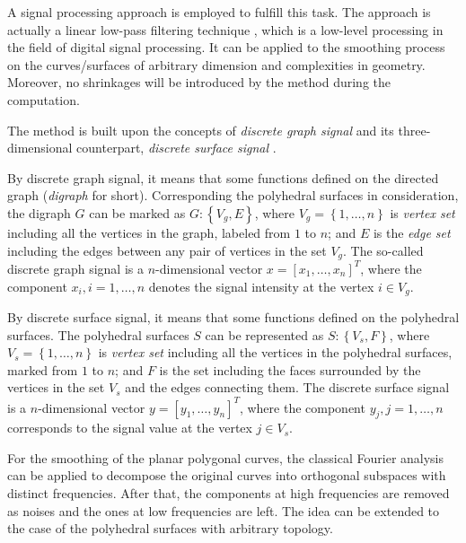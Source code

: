 A signal processing approach is employed to fulfill this task.
The approach is actually a linear low-pass filtering technique \cite{Taubin1995ICCV}, which is a low-level processing in the field of digital signal processing.
It can be applied to the smoothing process on the curves/surfaces of arbitrary dimension and complexities in geometry.
Moreover, no shrinkages will be introduced by the method during the computation.

The method is built upon the concepts of \emph{discrete graph signal} and its three-dimensional counterpart, \emph{discrete surface signal} \cite{Taubin1995SIG}.

By discrete graph signal, it means that some functions defined on the directed graph (\emph{digraph} for short).
Corresponding the polyhedral surfaces in consideration, the digraph $G$ can be marked as $G: \left\{ V_g, E\right\}$, where $V_g = \left\{ 1, \ldots, n \right\}$ is \emph{vertex set} including all the vertices in the graph, labeled from $1$ to $n$; and $E$ is the \emph{edge set} including the edges between any pair of vertices in the set $V_g$. %
The so-called discrete graph signal is a $n$-dimensional vector $x = \left[ x_1, \ldots, x_n \right]^T$, where the component $x_i, i = 1, \ldots, n$ denotes the signal intensity at the vertex $i \in V_g$. %

By discrete surface signal, it means that some functions defined on the polyhedral surfaces.
The polyhedral surfaces $S$ can be represented as $S: \left\{ V_s, F\right\}$, where $V_s = \left\{ 1, \ldots, n \right\}$ is \emph{vertex set} including all the vertices in the polyhedral surfaces, marked from $1$ to $n$; and $F$ is the set including the faces surrounded by the vertices in the set $V_s$ and the edges connecting them. %
The discrete surface signal is a $n$-dimensional vector $y = \left[ y_1, \ldots, y_n \right]^T$, where the component $y_j, j = 1, \ldots, n$ corresponds to the signal value at the vertex $j \in V_s$. %

For the smoothing of the planar polygonal curves, the classical Fourier analysis can be applied to decompose the original curves into orthogonal subspaces with distinct frequencies. %
After that, the components at high frequencies are removed as noises and the ones at low frequencies are left.
The idea can be extended to the case of the polyhedral surfaces with arbitrary topology.

